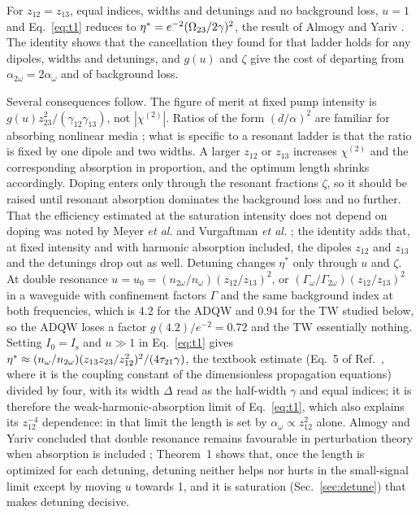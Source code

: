 \documentclass[11pt]{article}
\newcommand{\chitwo}{\chi^{(2)}}
\newcommand{\aw}{\alpha_{\omega}}
\newcommand{\aww}{\alpha_{2\omega}}
\newcommand{\Is}{I_\mathrm{s}}
\let\hbar\relax\DeclareRobustCommand{\hbar}{{\mathchar'26\mkern-9mu h}}
\begin{document}
For $z_{12}=z_{13}$, equal indices, widths and detunings and no background loss, $u=1$ and Eq.~\eqref{eq:t1} reduces to $\eta^*=e^{-2}(\hbar\Omega_{23}/2\gamma)^2$, the result of Almogy and Yariv \cite[Eq.~9.15]{AlmogyThesis1995}. The identity shows that the cancellation they found for that ladder holds for any dipoles, widths and detunings, and $g(u)$ and $\zeta$ give the cost of departing from $\aww=2\aw$ and of background loss.

Several consequences follow. The figure of merit at fixed pump intensity is $g(u)z_{23}^2/(\gamma_{12}\gamma_{13})$, not $|\chitwo|$. Ratios of the form $(d/\alpha)^2$ are familiar for absorbing nonlinear media \cite{Cherchi2010}; what is specific to a resonant ladder is that the ratio is fixed by one dipole and two widths. A larger $z_{12}$ or $z_{13}$ increases $\chitwo$ and the corresponding absorption in proportion, and the optimum length shrinks accordingly. Doping enters only through the resonant fractions $\zeta$, so it should be raised until resonant absorption dominates the background loss and no further. That the efficiency estimated at the saturation intensity does not depend on doping was noted by Meyer \emph{et al.} and Vurgaftman \emph{et al.} \cite{Meyer1995,Vurgaftman1996}; the identity adds that, at fixed intensity and with harmonic absorption included, the dipoles $z_{12}$ and $z_{13}$ and the detunings drop out as well. Detuning changes $\eta^*$ only through $u$ and $\zeta$. At double resonance $u=u_0=(n_{2\omega}/n_\omega)(z_{12}/z_{13})^2$, or $(\Gamma_\omega/\Gamma_{2\omega})(z_{12}/z_{13})^2$ in a waveguide with confinement factors $\Gamma$ and the same background index at both frequencies, which is 4.2 for the ADQW and 0.94 for the TW studied below, so the ADQW loses a factor $g(4.2)/e^{-2}=0.72$ and the TW essentially nothing. Setting $I_0=\Is$ and $u\gg1$ in Eq.~\eqref{eq:t1} gives $\eta^*\approx(n_\omega/n_{2\omega})(z_{13}z_{23}/z_{12}^2)^2\hbar/(4\tau_{21}\gamma)$, the textbook estimate \cite{Vurgaftman2021} (Eq.~5 of Ref.~\cite{Vurgaftman1996}, where it is the coupling constant of the dimensionless propagation equations) divided by four, with its width $\Delta$ read as the half-width $\gamma$ and equal indices; it is therefore the weak-harmonic-absorption limit of Eq.~\eqref{eq:t1}, which also explains its $z_{12}^{-4}$ dependence: in that limit the length is set by $\aw\propto z_{12}^2$ alone. Almogy and Yariv concluded that double resonance remains favourable in perturbation theory when absorption is included \cite{Almogy1994}; Theorem~1 shows that, once the length is optimized for each detuning, detuning neither helps nor hurts in the small-signal limit except by moving $u$ towards 1, and it is saturation (Sec.~\ref{sec:detune}) that makes detuning decisive.
\end{document}
